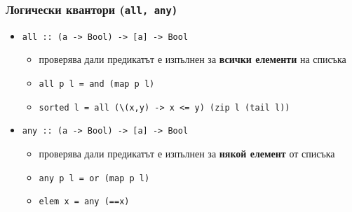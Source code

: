 \documentclass{beamer}
\begin{document}
\begin{frame}
  \frametitle{Логически квантори (\tt{all}, \tt{any})}
  \begin{itemize}[<+->]
  \item \tt{all :: (a -> Bool) -> [a] -> Bool}
    \begin{itemize}
    \item проверява дали предикатът е изпълнен за \textbf{всички елементи} на списъка
    \item \tt{all p l = and (map p l)}
    \item \tt{sorted l = all (\textbackslash(x,y) -> x <= y) (zip l (tail l))}
    \end{itemize}
  \item \tt{any :: (a -> Bool) -> [a] -> Bool}
    \begin{itemize}
    \item проверява дали предикатът е изпълнен за \textbf{някой елемент} от списъка
    \item \tt{any p l = or (map p l)}
    \item \tt{elem x = any (==x)}
    \end{itemize}
  \end{itemize}
\end{frame}
\end{document}
